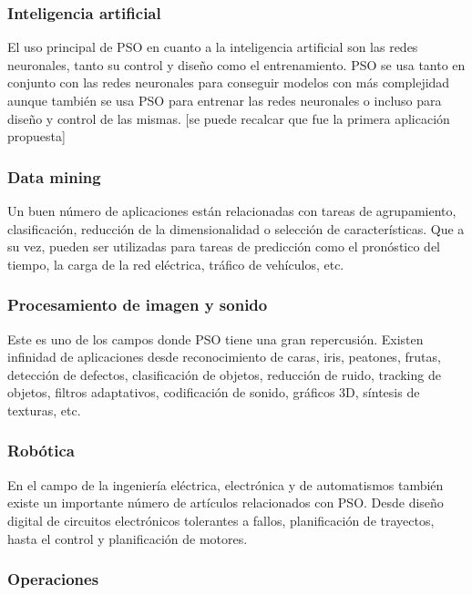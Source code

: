 \documentclass[a4paper,12pt,titlepage]{article}
\begin{document}
\subsubsection{Inteligencia artificial}

El uso principal de PSO en cuanto a la inteligencia artificial son las redes neuronales, tanto su control y diseño como el entrenamiento.
PSO se usa tanto en conjunto con las redes neuronales para conseguir modelos con más complejidad aunque también se usa PSO para entrenar las redes neuronales o incluso para diseño y control de las mismas. [se puede recalcar que fue la primera aplicación propuesta]

\subsubsection{Data mining}

Un buen número de aplicaciones están relacionadas con tareas de agrupamiento, clasificación, reducción de la dimensionalidad o selección de características. Que a su vez, pueden ser utilizadas para tareas de predicción como el pronóstico del tiempo, la carga de la red eléctrica, tráfico de vehículos, etc.

\subsubsection{Procesamiento de imagen y sonido}

Este es uno de los campos donde PSO tiene una gran repercusión. Existen infinidad de aplicaciones desde reconocimiento de caras, iris, peatones, frutas, detección de defectos, clasificación de objetos, reducción de ruido, tracking de objetos, filtros adaptativos, codificación de sonido, gráficos 3D, síntesis de texturas, etc.

\subsubsection{Robótica}

En el campo de la ingeniería eléctrica, electrónica y de automatismos también existe un importante número de artículos relacionados con PSO. Desde diseño digital de circuitos electrónicos tolerantes a fallos, planificación de trayectos, hasta el control y planificación de motores.

\subsubsection{Operaciones}
\end{document}
